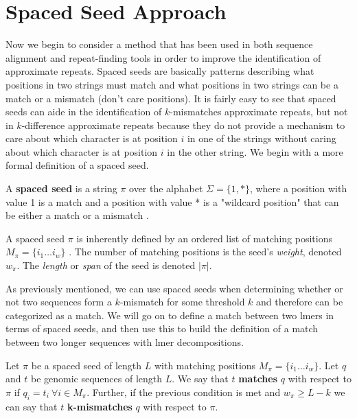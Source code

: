 \section{Spaced Seed Approach}
Now we begin to consider a method that has been used in both sequence alignment and repeat-finding tools in order to improve the identification of approximate repeats. Spaced seeds are basically patterns describing what positions in two strings must match and what positions in two strings can be a match or a mismatch (don't care positions). It is fairly easy to see that spaced seeds can aide in the identification of $k$-mismatches approximate repeats, but not in $k$-difference approximate repeats because they do not provide a mechanism to care about which character is at position $i$ in one of the strings without caring about which character is at position $i$ in the other string. We begin with a more formal definition of a spaced seed.

\begin{defn}
A \textbf{spaced seed} is a string $\pi$ over the alphabet $\Sigma =\lbrace 1,* \rbrace$, where a position with value 1 is a match and a position with value * is a "wildcard position" that can be either a match or a mismatch \cite{chao2008sequence}. \end{defn}

A spaced seed $\pi$ is inherently defined by an ordered list of matching positions $M_{\pi} = \lbrace i_{1} \dotsc i_{w} \rbrace$ \cite{buhler2005designing}. The number of matching positions is the seed's \textit{weight}, denoted $w_{\pi}$. The \textit{length} or \textit{span} of the seed is denoted $\lvert \pi \rvert$. 

As previously mentioned, we can use spaced seeds when determining whether or not two sequences form a $k$-mismatch for some threshold $k$ and therefore can be categorized as a match. We will go on to define a match between two lmers in terms of spaced seeds, and then use this to build the definition of a match between two longer sequences with lmer decompositions.

\begin{defn}
Let $\pi$ be a spaced seed of length $L$ with matching positions $M_{\pi} = \lbrace i_{1} \dotsc i_{w} \rbrace$. Let $q$ and $t$ be genomic sequences of length $L$. We say that $t$ \textbf{matches} $q$ with respect to $\pi$ if $q_{i} = t_{i} \ \forall i \in M_{\pi}$. Further, if the previous condition is met and $w_{\pi} \geq L-k$ we can say that $t$ \textbf{k-mismatches} $q$  with respect to $\pi$.
\end{defn}

